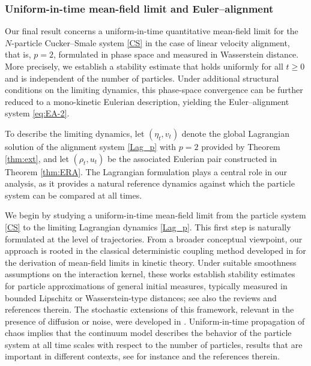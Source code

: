 \documentclass[10pt,reqno]{amsart}
\renewcommand{\geq}{\geqslant}
\numberwithin{equation}{section}
\begin{document}
  


                      


 
\subsubsection{Uniform-in-time mean-field limit and Euler--alignment}\label{sssec:mf}
Our final result concerns a uniform-in-time quantitative mean-field limit for the $N$-particle Cucker--Smale system \eqref{CS} in the case of linear velocity alignment, that is, $p = 2$, formulated in phase space and measured in Wasserstein distance. More precisely, we establish a stability estimate that holds uniformly for all $t \geq 0$ and is independent of the number of particles. Under additional structural conditions on the limiting dynamics, this phase-space convergence can be further reduced to a mono-kinetic Eulerian description, yielding the Euler--alignment system \eqref{eq:EA-2}.

To describe the limiting dynamics, let $(\eta_t,v_t)$ denote the global Lagrangian solution of the alignment system \eqref{Lag_p} with $p=2$ provided by Theorem \ref{thm:ext}, and let $(\rho_t,u_t)$ be the associated Eulerian pair constructed in Theorem \ref{thm:ERA}. The Lagrangian formulation plays a central role in our analysis, as it provides a natural reference dynamics against which the particle system can be compared at all times.

We begin by studying a uniform-in-time mean-field limit from the particle system \eqref{CS} to the limiting Lagrangian dynamics \eqref{Lag_p}. This first step is naturally formulated at the level of trajectories. From a broader conceptual viewpoint, our approach is rooted in the classical deterministic coupling method developed in \cite{BH77, Dob79, Neu84}  for the derivation of mean-field limits in kinetic theory. Under suitable smoothness assumptions on the interaction kernel, these works establish stability estimates for particle approximations of general initial measures, typically measured in bounded Lipschitz or Wasserstein-type distances; see also the reviews \cite{CCH14b, Jab14, Spo91} and references therein. The stochastic extensions of this framework, relevant in the presence of diffusion or noise, were developed in \cite{Mel96, Szn91}. Uniform-in-time propagation of chaos implies that the continuum model describes the behavior of the particle system at all time scales with respect to the number of particles, results that are important in different contexts, see for instance \cite{DGPS} and the references therein.
\end{document}
